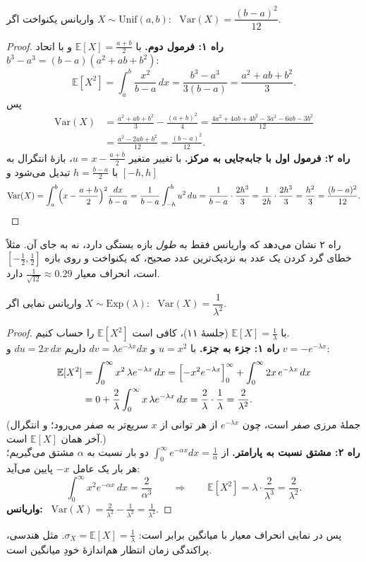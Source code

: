 \begin{proposition}[label=prop:V-unif]{واریانس یکنواخت}
  اگر $X\sim\mathrm{Unif}(a,b)$: \ $\mathrm{Var}(X)=\dfrac{(b-a)^2}{12}$.
\end{proposition}
\begin{proof}
  \textbf{راه ۱: فرمول دوم.} با $\mathbb E[X]=\frac{a+b}2$ و با اتحاد $b^3-a^3=(b-a)(a^2+ab+b^2)$:
  \[ \mathbb E[X^2]=\int_a^b\frac{x^2}{b-a}\,dx=\frac{b^3-a^3}{3(b-a)}=\frac{a^2+ab+b^2}{3}. \]
  پس
  \begin{align*}
    \mathrm{Var}(X) & =\frac{a^2+ab+b^2}{3}-\frac{(a+b)^2}{4}=\frac{4a^2+4ab+4b^2-3a^2-6ab-3b^2}{12} \\
                    & =\frac{a^2-2ab+b^2}{12}=\frac{(b-a)^2}{12}.
  \end{align*}
  \textbf{راه ۲: فرمول اول با جابه‌جایی به مرکز.} با تغییر متغیر $u=x-\frac{a+b}{2}$، بازهٔ انتگرال به $[-h,h]$ با $h=\frac{b-a}2$ تبدیل می‌شود و
  \[ \mathrm{Var}(X)=\int_a^b\Bigl(x-\frac{a+b}{2}\Bigr)^2\frac{dx}{b-a}=\frac{1}{b-a}\int_{-h}^{h}u^2\,du=\frac{1}{b-a}\cdot\frac{2h^3}{3}=\frac{1}{2h}\cdot\frac{2h^3}{3}=\frac{h^2}{3}=\frac{(b-a)^2}{12}. \]
\end{proof}
راه ۲ نشان می‌دهد که واریانس فقط به \emph{طول} بازه بستگی دارد، نه به جای آن. مثلاً خطای گرد کردن یک عدد به نزدیک‌ترین عدد صحیح، که یکنواخت و روی بازه $[-\tfrac12,\tfrac12]$ است، انحراف معیار $\frac{1}{\sqrt{12}}\approx0.29$ دارد.

\begin{proposition}[label=prop:V-exp]{واریانس نمایی}
  اگر $X\sim\mathrm{Exp}(\lambda)$: \ $\mathrm{Var}(X)=\dfrac{1}{\lambda^2}$.
\end{proposition}
\begin{proof}
  با $\mathbb E[X]=\frac1\lambda$ (جلسهٔ ۱۱)، کافی است $\mathbb E[X^2]$ را حساب کنیم.\\
  \textbf{راه ۱: جزء به جزء.} با $u=x^2$ و $dv=\lambda e^{-\lambda x}dx$ داریم $du=2x\,dx$ و $v=-e^{-\lambda x}$:
  \begin{align*}
    \mathbb E[X^2] & =\int_0^\infty x^2\,\lambda e^{-\lambda x}\,dx=\Bigl[-x^2e^{-\lambda x}\Bigr]_0^\infty+\int_0^\infty2x\,e^{-\lambda x}\,dx \\
                   & =0+\frac2\lambda\int_0^\infty x\,\lambda e^{-\lambda x}\,dx=\frac2\lambda\cdot\frac1\lambda=\frac{2}{\lambda^2}.
  \end{align*}
  (جملهٔ مرزی صفر است، چون $e^{-\lambda x}$ از هر توانی از $x$ سریع‌تر به صفر می‌رود؛ و انتگرال آخر همان $\mathbb E[X]$ است.)\\[3pt]
  \textbf{راه ۲: مشتق نسبت به پارامتر.} از $\int_0^\infty e^{-\alpha x}dx=\frac1\alpha$ دو بار نسبت به $\alpha$ مشتق می‌گیریم؛ هر بار یک عامل $-x$ پایین می‌آید:
  \[ \int_0^\infty x^2e^{-\alpha x}\,dx=\frac{2}{\alpha^3}\qquad\Longrightarrow\qquad \mathbb E[X^2]=\lambda\cdot\frac{2}{\lambda^3}=\frac{2}{\lambda^2}. \]
  \textbf{واریانس:} \ $\mathrm{Var}(X)=\frac{2}{\lambda^2}-\frac{1}{\lambda^2}=\frac{1}{\lambda^2}$.
\end{proof}
پس در نمایی انحراف معیار با میانگین برابر است: $\sigma_X=\mathbb E[X]=\frac1\lambda$. مثل هندسی، پراکندگی زمان انتظار هم‌اندازهٔ خودِ میانگین است.

